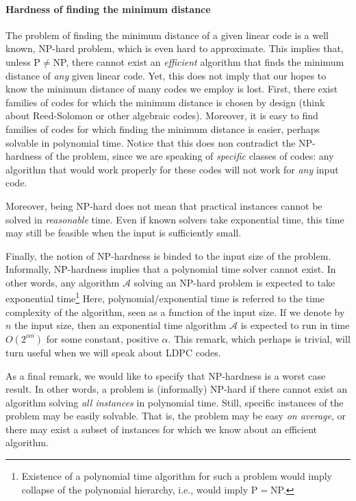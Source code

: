 \paragraph{Hardness of finding the minimum distance}

The problem of finding the minimum distance of a given linear code is a well known, NP-hard problem, which is even hard to approximate.
This implies that, unless P$\neq$NP, there cannot exist an \textit{efficient} algorithm that finds the minimum distance of \textit{any} given linear code.
Yet, this does not imply that our hopes to know the minimum distance of many codes we employ is lost.
First, there exist families of codes for which the minimum distance is chosen by design (think about Reed-Solomon or other algebraic codes).
Moreover, it is easy to find families of codes for which finding the minimum distance is easier, perhaps solvable in polynomial time.
Notice that this does non contradict the NP-hardness of the problem, since we are speaking of \textit{specific} classes of codes: any algorithm that would work properly for these codes will not work for \textit{any} input code.

Moreover, being NP-hard does not mean that practical instances cannot be solved in \textit{reasonable} time.
Even if known solvers take exponential time, this time may still be feasible when the input is sufficiently small.

Finally, the notion of NP-hardness is binded to the input size of the problem.
Informally, NP-hardness implies that a polynomial time solver cannot exist.
In other words, any algorithm $\mathcal A$ solving an NP-hard problem is expected to take exponential time\footnote{Existence of a polynomial time algorithm for such a problem would imply collapse of the polynomial hierarchy, i.e., would imply P$=$NP.}
Here, polynomial/exponential time is referred to the time complexity of the algorithm, seen as a function of the input size.
If we denote by $n$ the input size, then an exponential time algorithm $\mathcal A$ is expected to run in time $O(2^{\alpha n})$ for some constant, positive $\alpha$.
This remark, which perhaps is trivial, will turn useful when we will speak about LDPC codes.

As a final remark, we would like to specify that NP-hardness is a worst case result.
In other words, a problem is (informally) NP-hard if there cannot exist an algorithm solving \textit{all instances} in polynomial time.
Still, specific instances of the problem may be easily solvable.
That is, the problem may be easy \textit{on average}, or there may exist a subset of instances for which we know about an efficient algorithm.


